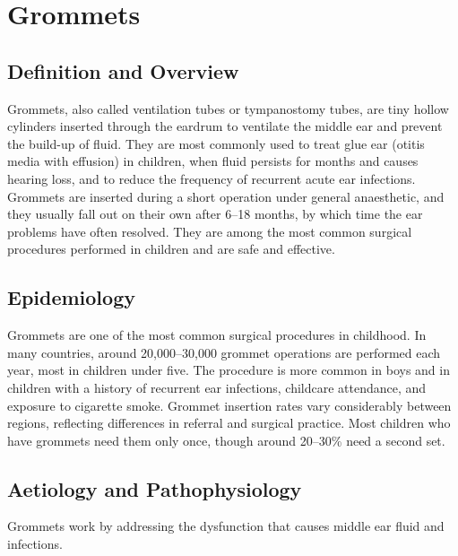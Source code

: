 \chapter{Grommets}

\section*{Definition and Overview}
Grommets, also called ventilation tubes or tympanostomy tubes, are tiny hollow cylinders inserted through the eardrum to ventilate the middle ear and prevent the build-up of fluid. They are most commonly used to treat glue ear (otitis media with effusion) in children, when fluid persists for months and causes hearing loss, and to reduce the frequency of recurrent acute ear infections. Grommets are inserted during a short operation under general anaesthetic, and they usually fall out on their own after 6--18 months, by which time the ear problems have often resolved. They are among the most common surgical procedures performed in children and are safe and effective.

\section*{Epidemiology}
Grommets are one of the most common surgical procedures in childhood. In many countries, around 20,000--30,000 grommet operations are performed each year, most in children under five. The procedure is more common in boys and in children with a history of recurrent ear infections, childcare attendance, and exposure to cigarette smoke. Grommet insertion rates vary considerably between regions, reflecting differences in referral and surgical practice. Most children who have grommets need them only once, though around 20--30\% need a second set.

\section*{Aetiology and Pathophysiology}
Grommets work by addressing the dysfunction that causes middle ear fluid and infections.

